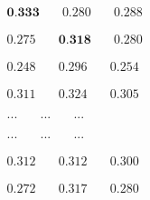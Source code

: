 \newsavebox\embeddiobSF
\begin{lrbox}{\embeddiobSF}
   $\begin{aligned}
     \textbf{0.333} & \quad 0.280 & \quad 0.288
    \end{aligned} $
\end{lrbox}

\newsavebox\embeddiobFoote
\begin{lrbox}{\embeddiobFoote}
   $\begin{aligned}
     0.275 & \quad \textbf{0.318} & \quad 0.280
    \end{aligned} $
\end{lrbox}

\newsavebox\embeddiobCNMF
\begin{lrbox}{\embeddiobCNMF}
   $\begin{aligned}
     0.248 & \quad 0.296 & \quad 0.254
    \end{aligned} $
\end{lrbox}

\newsavebox\pcpSF
\begin{lrbox}{\pcpSF}
   $\begin{aligned}
     0.311 & \quad 0.324 & \quad 0.305
    \end{aligned} $
\end{lrbox}

\newsavebox\pcpFoote
\begin{lrbox}{\pcpFoote}
   $\begin{aligned}
     ... & \quad ... & \quad ...
    \end{aligned} $
\end{lrbox}

\newsavebox\pcpCNMF
\begin{lrbox}{\pcpCNMF}
   $\begin{aligned}
     ... & \quad ... & \quad ...
    \end{aligned} $
\end{lrbox}

\newsavebox\tonnetzSF
\begin{lrbox}{\tonnetzSF}
   $\begin{aligned}
     0.312 & \quad 0.312 & \quad 0.300
    \end{aligned} $
\end{lrbox}

\newsavebox\tonnetzFoote
\begin{lrbox}{\tonnetzFoote}
   $\begin{aligned}
     0.272 & \quad 0.317 & \quad 0.280
    \end{aligned} $
\end{lrbox}

